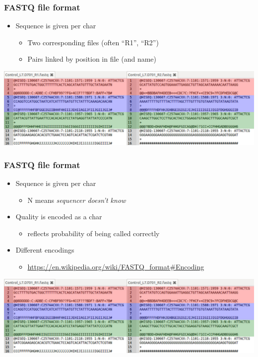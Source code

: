 \documentclass{beamer}			  %
\begin{document}
\begin{frame}
	\frametitle{FASTQ file format}
	\begin{itemize}
		\item Sequence is given per char
		\begin{itemize}
			\item Two corresponding files (often ``R1”, ``R2”)
			\item Pairs linked by position in file (and name)
		\end{itemize}
	\end{itemize}
	\begin{center}
		\includegraphics[width=\textwidth]{figures/dge_03bp.png}
	\end{center}
\end{frame}

\begin{frame}
	\frametitle{FASTQ file format}
	\begin{itemize}
		\item Sequence is given per char
		\begin{itemize}
			\item N means \textit{sequencer doesn't know}
		\end{itemize}
		\item Quality is encoded as a char
		\begin{itemize}
			\item reflects probability of being called correctly
		\end{itemize}
		\item Different encodings
		\begin{itemize}
			\item {\scriptsize \url{https://en.wikipedia.org/wiki/FASTQ\_format\#Encoding}}
		\end{itemize}
	\end{itemize}
	\begin{center}
		\includegraphics[width=\textwidth]{figures/dge_03bp.png}
	\end{center}
\end{frame}
\end{document}
